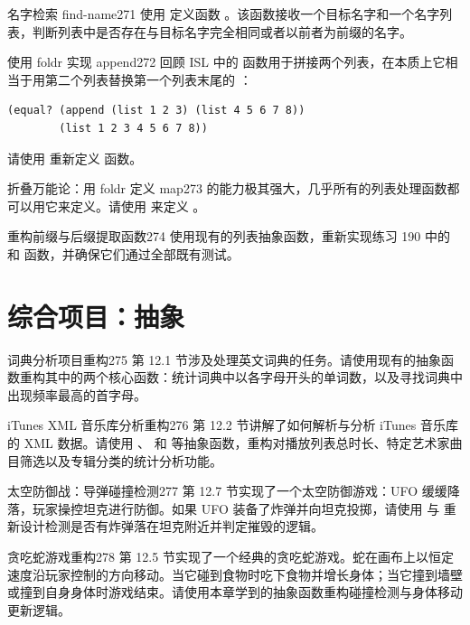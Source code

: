 \begin{exercise}{名字检索 find-name}{271}
使用  定义函数 。该函数接收一个目标名字和一个名字列表，判断列表中是否存在与目标名字完全相同或者以前者为前缀的名字。
\end{exercise}

\begin{exercise}{使用 foldr 实现 append}{272}
回顾 ISL 中的  函数用于拼接两个列表，在本质上它相当于用第二个列表替换第一个列表末尾的 ：

\begin{lstlisting}[language=BSL]
(equal? (append (list 1 2 3) (list 4 5 6 7 8))
        (list 1 2 3 4 5 6 7 8))
\end{lstlisting}

请使用  重新定义  函数。
\end{exercise}

\begin{exercise}{折叠万能论：用 foldr 定义 map}{273}
 的能力极其强大，几乎所有的列表处理函数都可以用它来定义。请使用  来定义 。
\end{exercise}

\begin{exercise}{重构前缀与后缀提取函数}{274}
使用现有的列表抽象函数，重新实现练习 190 中的  和  函数，并确保它们通过全部既有测试。
\end{exercise}

\section{综合项目：抽象}
\label{sec:16_8}

\begin{exercise}{词典分析项目重构}{275}
第 12.1 节涉及处理英文词典的任务。请使用现有的抽象函数重构其中的两个核心函数：统计词典中以各字母开头的单词数，以及寻找词典中出现频率最高的首字母。
\end{exercise}

\begin{exercise}{iTunes XML 音乐库分析重构}{276}
第 12.2 节讲解了如何解析与分析 iTunes 音乐库的 XML 数据。请使用 、 和  等抽象函数，重构对播放列表总时长、特定艺术家曲目筛选以及专辑分类的统计分析功能。
\end{exercise}

\begin{exercise}{太空防御战：导弹碰撞检测}{277}
第 12.7 节实现了一个太空防御游戏：UFO 缓缓降落，玩家操控坦克进行防御。如果 UFO 装备了炸弹并向坦克投掷，请使用  与  重新设计检测是否有炸弹落在坦克附近并判定摧毁的逻辑。
\end{exercise}

\begin{exercise}{贪吃蛇游戏重构}{278}
第 12.5 节实现了一个经典的贪吃蛇游戏。蛇在画布上以恒定速度沿玩家控制的方向移动。当它碰到食物时吃下食物并增长身体；当它撞到墙壁或撞到自身身体时游戏结束。请使用本章学到的抽象函数重构碰撞检测与身体移动更新逻辑。
\end{exercise}
